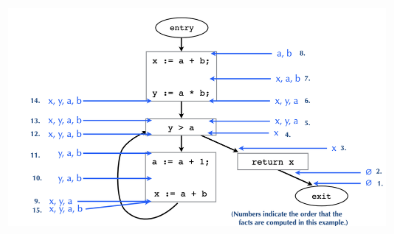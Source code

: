 \documentclass[a4paper]{article}
\theoremstyle{definition}
\begin{document}
\begin{figure}[htbp]
  \centering
  \includegraphics[width=10cm]{./img/liveness.png}
\end{figure}
\printbibliography
\end{document}

